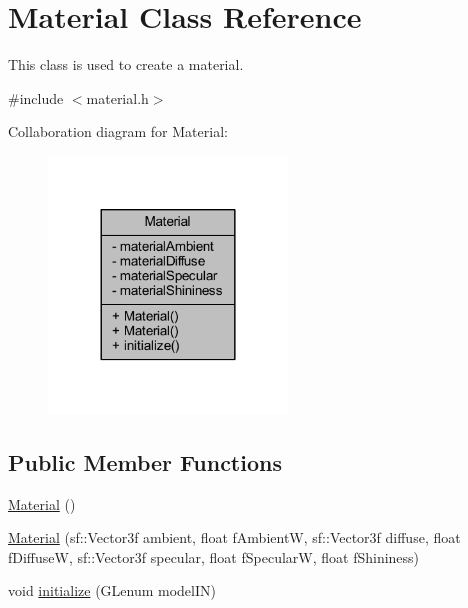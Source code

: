 \hypertarget{class_material}{}\section{Material Class Reference}
\label{class_material}


This class is used to create a material.  




{\ttfamily \#include $<$material.\+h$>$}



Collaboration diagram for Material\+:\nopagebreak
\begin{figure}[H]
\begin{center}
\leavevmode
\includegraphics[width=180pt]{class_material__coll__graph}
\end{center}
\end{figure}
\subsection*{Public Member Functions}
\begin{DoxyCompactItemize}
\item 
\hyperlink{class_material_a137e987401b63eb7c6c27c3e38bc74b5}{Material} ()
\item 
\hyperlink{class_material_a37d1580c7ab5e7e31e7210a374d82364}{Material} (sf\+::\+Vector3f ambient, float f\+AmbientW, sf\+::\+Vector3f diffuse, float f\+DiffuseW, sf\+::\+Vector3f specular, float f\+SpecularW, float f\+Shininess)
\item 
void \hyperlink{class_material_aae516fe81f34adfead3ff7ae0cc9c92e}{initialize} (G\+Lenum model\+IN)
\end{DoxyCompactItemize}
